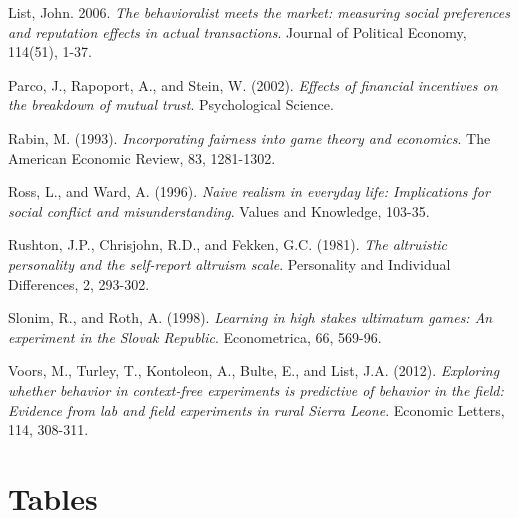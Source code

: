 \documentclass{article}
\begin{document}
{\begin{thebibliography}{9}
List, John. 2006.
\textit{The behavioralist meets the market: measuring social preferences and reputation effects in actual transactions}.
Journal of Political Economy, 114(51), 1-37.


Parco, J., Rapoport, A., and Stein, W. (2002).
\textit{Effects of financial incentives on the breakdown of mutual trust}.
Psychological Science.

Rabin, M. (1993).
\textit{Incorporating fairness into game theory and economics}.
The American Economic Review, 83, 1281-1302.

Ross, L., and Ward, A. (1996).
\textit{Naive realism in everyday life: Implications for social conflict and misunderstanding}.
Values and Knowledge, 103-35.

Rushton, J.P., Chrisjohn, R.D., and Fekken, G.C. (1981).
\textit{The altruistic personality and the self-report altruism scale}.
Personality and Individual Differences, 2, 293-302.

Slonim, R., and Roth, A. (1998).
\textit{Learning in high stakes ultimatum games: An experiment in the Slovak Republic}.
Econometrica, 66, 569-96.


Voors, M., Turley, T., Kontoleon, A., Bulte, E., and List, J.A. (2012).
\textit{Exploring whether behavior in context-free experiments is predictive of behavior in the field: Evidence from lab and field experiments in rural Sierra Leone}.
Economic Letters, 114, 308-311.


\end{thebibliography}


\appendix
\section{Tables}

}
\end{document}

